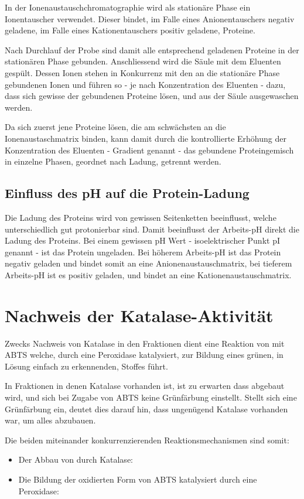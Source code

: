 \documentclass[a4paper,german]{scrreprt}
\begin{document}
In der Ionenaustauschchromatographie wird als stationäre Phase ein
Ionentauscher verwendet. Dieser bindet, im Falle eines Anionentauschers negativ
geladene, im Falle eines Kationentauschers positiv geladene, Proteine.

Nach Durchlauf der Probe sind damit alle entsprechend geladenen Proteine in der
stationären Phase gebunden. Anschliessend wird die Säule mit dem Eluenten
gespült. Dessen Ionen stehen in Konkurrenz mit den an die stationäre Phase
gebundenen Ionen und führen so - je nach Konzentration des Eluenten - dazu,
dass sich gewisse der gebundenen Proteine lösen, und aus der Säule ausgewaschen
werden.

Da sich zuerst jene Proteine lösen, die am schwächsten an die
Ionenaustaschmatrix binden, kann damit durch die kontrollierte Erhöhung der
Konzentration des Eluenten - Gradient genannt - das gebundene Proteingemisch in
einzelne Phasen, geordnet nach Ladung, getrennt werden.

\subsection{Einfluss des pH auf die Protein-Ladung}

Die Ladung des Proteins wird von gewissen Seitenketten beeinflusst, welche
unterschiedlich gut protonierbar sind. Damit beeinflusst der Arbeits-pH direkt
die Ladung des Proteins. Bei einem gewissen pH Wert - isoelektrischer Punkt pI
genannt - ist das Protein ungeladen. Bei höherem Arbeits-pH ist das Protein
negativ geladen und bindet somit an eine Anionenaustauschmatrix, bei tieferem
Arbeits-pH ist es positiv geladen, und bindet an eine Kationenaustauschmatrix.

\section{Nachweis der Katalase-Aktivität}

Zwecks Nachweis von Katalase in den Fraktionen dient eine Reaktion von
 mit ABTS welche, durch eine Peroxidase katalysiert, zur Bildung eines
grünen, in Lösung einfach zu erkennenden, Stoffes führt.

In Fraktionen in denen Katalase vorhanden ist, ist zu erwarten dass 
abgebaut wird, und sich bei Zugabe von ABTS keine Grünfärbung einstellt. Stellt
sich eine Grünfärbung ein, deutet dies darauf hin, dass ungenügend Katalase
vorhanden war, um alles  abzubauen.

Die beiden miteinander konkurrenzierenden Reaktionsmechanismen sind somit:
\begin{itemize}
	\item Der Abbau von  durch Katalase: 
	\item Die Bildung der oxidierten Form von ABTS katalysiert durch eine
		Peroxidase: 
\end{itemize}
\end{document}
